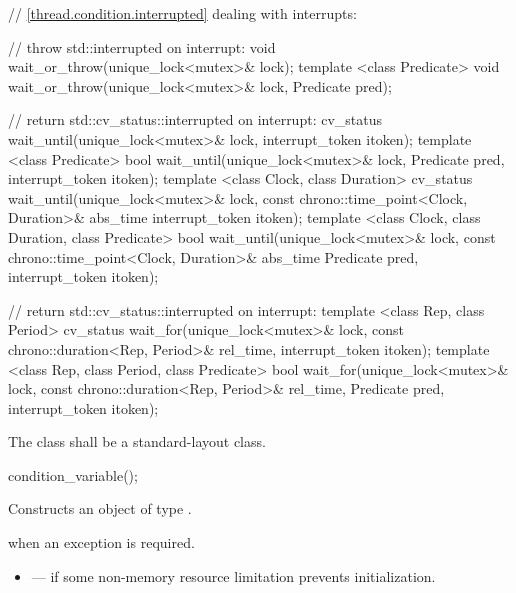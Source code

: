 {\color{insertcolor}
\begin{codeblock}
    // \ref{thread.condition.interrupted} dealing with interrupts:

    // throw std::interrupted on interrupt:
    void wait_or_throw(unique_lock<mutex>& lock);
    template <class Predicate>
      void wait_or_throw(unique_lock<mutex>& lock, Predicate pred);

    // return std::cv_status::interrupted on interrupt:
    cv_status wait_until(unique_lock<mutex>& lock,
                         interrupt_token itoken);
    template <class Predicate>
      bool wait_until(unique_lock<mutex>& lock,
                      Predicate pred,
                      interrupt_token itoken);
    template <class Clock, class Duration>
      cv_status wait_until(unique_lock<mutex>& lock,
                           const chrono::time_point<Clock, Duration>& abs_time
                           interrupt_token itoken);
    template <class Clock, class Duration, class Predicate>
      bool wait_until(unique_lock<mutex>& lock,
                      const chrono::time_point<Clock, Duration>& abs_time
                      Predicate pred,
                      interrupt_token itoken);

    // return std::cv_status::interrupted on interrupt:
    template <class Rep, class Period>
    cv_status wait_for(unique_lock<mutex>& lock,
                       const chrono::duration<Rep, Period>& rel_time,
                       interrupt_token itoken);
    template <class Rep, class Period, class Predicate>
    bool wait_for(unique_lock<mutex>& lock,
                  const chrono::duration<Rep, Period>& rel_time,
                  Predicate pred,
                  interrupt_token itoken);
\end{codeblock}
}
\begin{codeblock}
    using native_handle_type = @\impdefnc@;          // see~\ref{thread.req.native}
    native_handle_type native_handle();                         // see~\ref{thread.req.native}
  };
}
\end{codeblock}

\pnum
The class  shall be a standard-layout class.

%
\begin{itemdecl}
condition_variable();
\end{itemdecl}

\begin{itemdescr}
\pnum
\effects Constructs an object of type .

\pnum
\throws {} when an exception is required.

\pnum
\errors
\begin{itemize}
\item {} --- if some non-memory resource
limitation prevents initialization.
\end{itemize}
\end{itemdescr}

